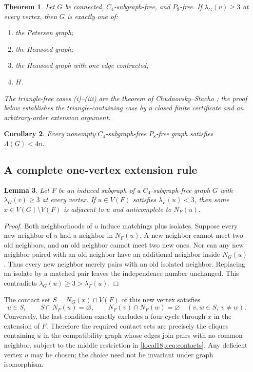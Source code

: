 \documentclass[11pt,a4paper]{article}
\newtheorem{theorem}{Theorem}[section]
\newtheorem{lemma}[theorem]{Lemma}
\newtheorem{corollary}[theorem]{Corollary}
\theoremstyle{definition}\newtheorem{definition}[theorem]{Definition}
\theoremstyle{remark}\newtheorem{remark}[theorem]{Remark}
\begin{document}
\begin{theorem}\label{local18p:thm:classification}
Let $G$ be connected, $C_4$-subgraph-free, and $P_8$-free. If
$\lambda_G(v)\ge3$ at every vertex, then $G$ is exactly one of:
\begin{enumerate}[label=\textup{(\roman*)}]
\item the Petersen graph;
\item the Heawood graph;
\item the Heawood graph with one edge contracted;
\item $H$.
\end{enumerate}
The triangle-free cases \textup{(i)--(iii)} are the theorem of
Chudnovsky--Stacho \cite[Theorem 1]{src:cs}; the proof below establishes
the triangle-containing case by a closed finite certificate and an
arbitrary-order extension argument.
\end{theorem}
\begin{corollary}\label{local18p:cor:density}
Every nonempty $C_4$-subgraph-free $P_8$-free graph satisfies $\Lambda(G)<4n$.
\end{corollary}

\subsection{A complete one-vertex extension rule}
\begin{lemma}\label{local18p:lem:extension}
Let $F$ be an induced subgraph of a $C_4$-subgraph-free graph $G$ with
$\lambda_G(v)\ge3$ at every vertex. If $u\in V(F)$ satisfies
$\lambda_F(u)<3$, then some $x\in V(G)\setminus V(F)$ is adjacent to $u$
and anticomplete to $N_F(u)$.
\end{lemma}
\begin{proof}
Both neighborhoods of $u$ induce matchings plus isolates. Suppose every
new neighbor of $u$ had a neighbor in $N_F(u)$. A new neighbor cannot
meet two old neighbors, and an old neighbor cannot meet two new ones.
Nor can any new neighbor paired with an old neighbor have an additional
neighbor inside $N_G(u)$. Thus every new neighbor merely pairs with an
old isolated neighbor. Replacing an isolate by a matched pair leaves
the independence number unchanged. This contradicts
$\lambda_G(u)\ge3>\lambda_F(u)$.
\end{proof}

The contact set $S=N_G(x)\cap V(F)$ of this new vertex satisfies
\begin{equation}\label{local18p:eq:contacts}
 u\in S,\qquad S\cap N_F(u)=\varnothing,\qquad
 N_F(v)\cap N_F(w)=\varnothing\quad(v,w\in S,\ v\ne w).
\end{equation}
Conversely, the last condition exactly excludes a four-cycle through
$x$ in the extension of $F$. Therefore the required contact sets are
precisely the cliques containing $u$ in the compatibility graph whose
edges join pairs with no common neighbor, subject to the middle
restriction in \eqref{local18p:eq:contacts}. Any deficient vertex $u$ may be
chosen; the choice need not be invariant under graph isomorphism.
\end{document}
